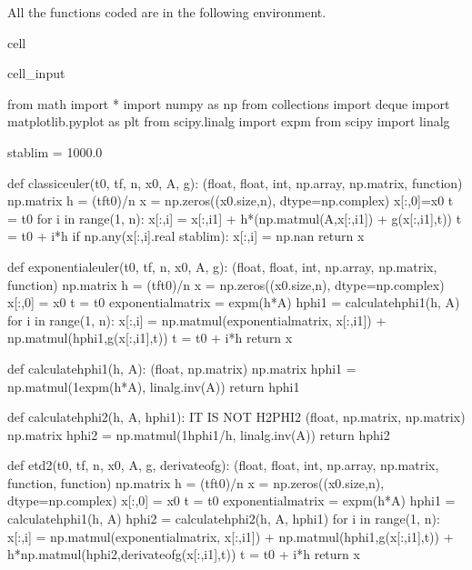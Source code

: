 \documentclass[letterpaper,10pt,english]{jupyterBook}
\begin{document}
\sphinxAtStartPar
All the functions coded are in the following environment.

\begin{sphinxuseclass}{cell}\begin{sphinxVerbatimInput}

\begin{sphinxuseclass}{cell_input}
\begin{sphinxVerbatim}[commandchars=\\\{\}]
from math import *
import numpy as np
from collections import deque
import matplotlib.pyplot as plt
from scipy.linalg import expm
from scipy import linalg

stab\PYGZus{}lim = 1000.0

def classic\PYGZus{}euler(t0, tf, n, x0, A, g):
    \PYGZsq{}\PYGZsq{}\PYGZsq{}(float, float, int, np.array, np.matrix, function) \PYGZhy{}\PYGZgt{} np.matrix\PYGZsq{}\PYGZsq{}\PYGZsq{}
    h = (tf\PYGZhy{}t0)/n
    x = np.zeros((x0.size,n), dtype=np.complex\PYGZus{})
    x[:,0]=x0
    t = t0
    for i in range(1, n):
        x[:,i] = x[:,i\PYGZhy{}1] + h*(np.matmul(\PYGZhy{}A,x[:,i\PYGZhy{}1]) + g(x[:,i\PYGZhy{}1],t))
        t = t0 + i*h
        if np.any(x[:,i].real \PYGZgt{} stab\PYGZus{}lim):
            x[:,i] = np.nan
    return x

def exponential\PYGZus{}euler(t0, tf, n, x0, A, g):
    \PYGZsq{}\PYGZsq{}\PYGZsq{}(float, float, int, np.array, np.matrix, function) \PYGZhy{}\PYGZgt{} np.matrix\PYGZsq{}\PYGZsq{}\PYGZsq{}
    h = (tf\PYGZhy{}t0)/n
    x = np.zeros((x0.size,n), dtype=np.complex\PYGZus{})
    x[:,0] = x0
    t = t0
    exponential\PYGZus{}matrix = expm(\PYGZhy{}h*A)
    hphi1 = calculate\PYGZus{}hphi1(h, A)
    for i in range(1, n):
        x[:,i] = np.matmul(exponential\PYGZus{}matrix, x[:,i\PYGZhy{}1]) + np.matmul(hphi1,g(x[:,i\PYGZhy{}1],t))
        t = t0 + i*h
    return x

def calculate\PYGZus{}hphi1(h, A):
    \PYGZsq{}\PYGZsq{}\PYGZsq{}(float, np.matrix) \PYGZhy{}\PYGZgt{} np.matrix\PYGZsq{}\PYGZsq{}\PYGZsq{}
    hphi1 = np.matmul(1\PYGZhy{}expm(\PYGZhy{}h*A), linalg.inv(A))
    return hphi1

def calculate\PYGZus{}hphi2(h, A, hphi1):
    \PYGZsh{}IT IS NOT H2PHI2
    \PYGZsq{}\PYGZsq{}\PYGZsq{}(float, np.matrix, np.matrix) \PYGZhy{}\PYGZgt{} np.matrix\PYGZsq{}\PYGZsq{}\PYGZsq{}
    hphi2 = np.matmul(1\PYGZhy{}hphi1/h, linalg.inv(A))
    return hphi2

def etd2(t0, tf, n, x0, A, g, derivate\PYGZus{}of\PYGZus{}g):
    \PYGZsq{}\PYGZsq{}\PYGZsq{}(float, float, int, np.array, np.matrix, function, function) \PYGZhy{}\PYGZgt{} np.matrix\PYGZsq{}\PYGZsq{}\PYGZsq{}
    h = (tf\PYGZhy{}t0)/n
    x = np.zeros((x0.size,n), dtype=np.complex\PYGZus{})
    x[:,0] = x0
    t = t0
    exponential\PYGZus{}matrix = expm(\PYGZhy{}h*A)
    hphi1 = calculate\PYGZus{}hphi1(h, A)
    hphi2 = calculate\PYGZus{}hphi2(h, A, hphi1)
    for i in range(1, n):
        x[:,i] = np.matmul(exponential\PYGZus{}matrix, x[:,i\PYGZhy{}1]) + np.matmul(hphi1,g(x[:,i\PYGZhy{}1],t)) + h*np.matmul(hphi2,derivate\PYGZus{}of\PYGZus{}g(x[:,i\PYGZhy{}1],t))
        t = t0 + i*h
    return x


\end{sphinxVerbatim}
\end{sphinxuseclass}
\end{sphinxVerbatimInput}
\end{sphinxuseclass}
\end{document}

